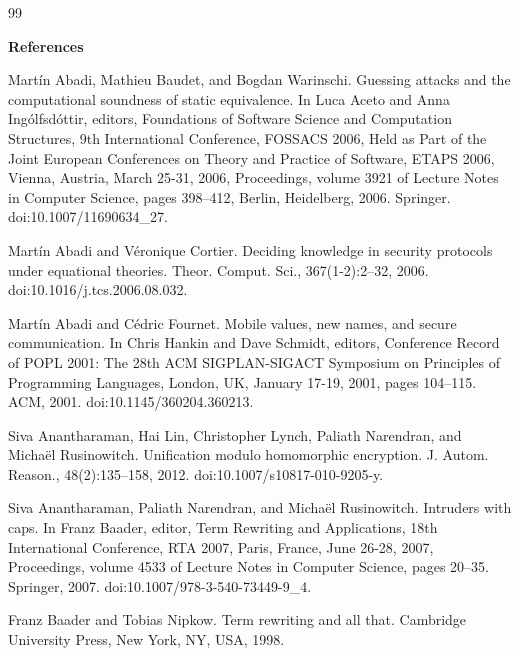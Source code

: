 \documentclass[10pt,a4paper]{amsart}
\begin{document}
\begin{thebibliography}{99}

 
\par\medskip\noindent\textbf{References}\par
  
\par\noindent  [1]  Martín Abadi, Mathieu Baudet, and Bogdan Warinschi.  Guessing attacks and the computational soundness of static equivalence.  In Luca Aceto and Anna Ingólfsdóttir, editors, Foundations of Software Science and Computation Structures, 9th International Conference, FOSSACS 2006, Held as Part of the Joint European Conferences on Theory and Practice of Software, ETAPS 2006, Vienna, Austria, March 25-31, 2006, Proceedings, volume 3921 of Lecture Notes in Computer Science, pages 398–412, Berlin, Heidelberg, 2006. Springer.  doi:10.1007/11690634\_27.  
 
\par\noindent  [2]  Martín Abadi and Véronique Cortier.  Deciding knowledge in security protocols under equational theories.  Theor. Comput. Sci., 367(1-2):2–32, 2006.  doi:10.1016/j.tcs.2006.08.032.  
 
\par\noindent  [3]  Martín Abadi and Cédric Fournet.  Mobile values, new names, and secure communication.  In Chris Hankin and Dave Schmidt, editors, Conference Record of POPL 2001: The 28th ACM SIGPLAN-SIGACT Symposium on Principles of Programming Languages, London, UK, January 17-19, 2001, pages 104–115. ACM, 2001.  doi:10.1145/360204.360213.  
 
\par\noindent  [4]  Siva Anantharaman, Hai Lin, Christopher Lynch, Paliath Narendran, and Michaël Rusinowitch.  Unification modulo homomorphic encryption.  J. Autom. Reason., 48(2):135–158, 2012.  doi:10.1007/s10817-010-9205-y.  
 
\par\noindent  [5]  Siva Anantharaman, Paliath Narendran, and Michaël Rusinowitch.  Intruders with caps.  In Franz Baader, editor, Term Rewriting and Applications, 18th International Conference, RTA 2007, Paris, France, June 26-28, 2007, Proceedings, volume 4533 of Lecture Notes in Computer Science, pages 20–35. Springer, 2007.  doi:10.1007/978-3-540-73449-9\_4.  
 
\par\noindent  [6]  Franz Baader and Tobias Nipkow.  Term rewriting and all that.  Cambridge University Press, New York, NY, USA, 1998.  
 

\end{thebibliography}
\end{document}

